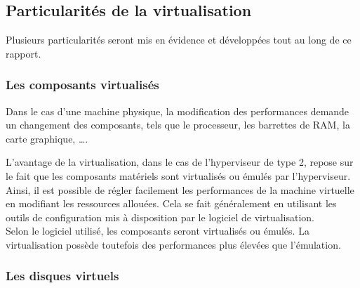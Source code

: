 
\subsection{Particularités de la virtualisation}
\label{Particularités de la virtualisation}

Plusieurs particularités seront mis en évidence et développées tout au long de ce rapport.
\\




\subsubsection{Les composants virtualisés}
\label{Les composants virtualisés}

Dans le cas d'une machine physique, la modification des performances demande un changement des composants, tels que le processeur, les barrettes de RAM, la carte graphique, \ldots.

L'avantage de la virtualisation, dans le cas de l'hyperviseur de type 2, repose sur le fait que les composants matériels sont virtualisés ou émulés par l'hyperviseur.
Ainsi, il est possible de régler facilement les performances de la machine virtuelle en modifiant les ressources allouées.
Cela se fait généralement en utilisant les outils de configuration mis à disposition par le logiciel de virtualisation.
\\


Selon le logiciel utilisé, les composants seront virtualisés ou émulés.
La virtualisation possède toutefois des performances plus élevées que l'émulation.
\\




\subsubsection{Les disques virtuels}
\label{Les disques virtuels}

